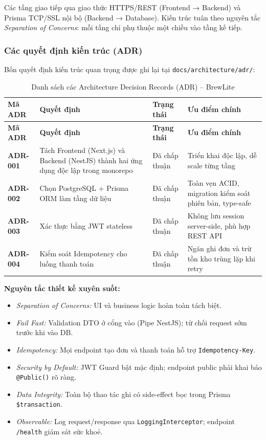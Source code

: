 \documentclass[a4paper]{article}
\begin{document}
Các tầng giao tiếp qua giao thức HTTPS/REST (Frontend → Backend) và Prisma TCP/SSL nội bộ (Backend → Database). Kiến trúc tuân theo nguyên tắc \textit{Separation of Concerns}: mỗi tầng chỉ phụ thuộc một chiều vào tầng kế tiếp.

\subsubsection{Các quyết định kiến trúc (ADR)}

Bốn quyết định kiến trúc quan trọng được ghi lại tại \texttt{docs/architecture/adr/}:

\begingroup
\renewcommand{\arraystretch}{1.3}
\setlength{\tabcolsep}{6pt}
\begin{longtable}{|p{2.2cm}|p{5.5cm}|p{2.0cm}|p{3.0cm}|}
\caption{Danh sách các Architecture Decision Records (ADR) -- BrewLite}
\label{tab:adr} \\
\hline
\textbf{Mã ADR} & \textbf{Quyết định} & \textbf{Trạng thái} & \textbf{Ưu điểm chính} \\ \hline
\endfirsthead
\hline
\textbf{Mã ADR} & \textbf{Quyết định} & \textbf{Trạng thái} & \textbf{Ưu điểm chính} \\ \hline
\endhead
\endfoot
\endlastfoot

\textbf{ADR-001} & Tách Frontend (Next.js) và Backend (NestJS) thành hai ứng dụng độc lập trong monorepo & Đã chấp thuận & Triển khai độc lập, dễ scale từng tầng \\ \hline
\textbf{ADR-002} & Chọn PostgreSQL + Prisma ORM làm tầng dữ liệu & Đã chấp thuận & Toàn vẹn ACID, migration kiểm soát phiên bản, type-safe \\ \hline
\textbf{ADR-003} & Xác thực bằng JWT stateless & Đã chấp thuận & Không lưu session server-side, phù hợp REST API \\ \hline
\textbf{ADR-004} & Kiểm soát Idempotency cho luồng thanh toán & Đã chấp thuận & Ngăn ghi đơn và trừ tồn kho trùng lặp khi retry \\ \hline
\end{longtable}
\endgroup

\textbf{Nguyên tắc thiết kế xuyên suốt:}
\begin{itemize}
    \item \textit{Separation of Concerns:} UI và business logic hoàn toàn tách biệt.
    \item \textit{Fail Fast:} Validation DTO ở cổng vào (Pipe NestJS); từ chối request sớm trước khi vào DB.
    \item \textit{Idempotency:} Mọi endpoint tạo đơn và thanh toán hỗ trợ \texttt{Idempotency-Key}.
    \item \textit{Security by Default:} JWT Guard bật mặc định; endpoint public phải khai báo \texttt{@Public()} rõ ràng.
    \item \textit{Data Integrity:} Toàn bộ thao tác ghi có side-effect bọc trong Prisma \texttt{\$transaction}.
    \item \textit{Observable:} Log request/response qua \texttt{LoggingInterceptor}; endpoint \texttt{/health} giám sát sức khoẻ.
\end{itemize}
\end{document}
